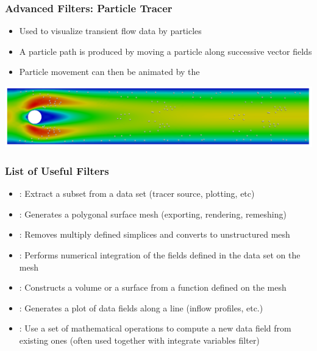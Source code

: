\begin{frame}

  \frametitle{Advanced Filters: Particle Tracer}

    \begin{itemize}
      \item Used to visualize transient flow data by particles 
      \item A particle path is produced by moving a particle along successive vector fields 
      \item Particle movement can then be animated by the  
    \end{itemize}
    \includegraphics[width=\textwidth]{screenshots/particle-tracer.png}

\end{frame}

\begin{frame}

  \frametitle{List of Useful Filters}

    \begin{itemize}
      \item {}: Extract a subset from a data set (tracer source, plotting, etc)
      \item {}: Generates a polygonal surface mesh (exporting, rendering, remeshing) 
      \item {}: Removes multiply defined simplices and converts to unstructured mesh
      \item {}: Performs numerical integration of the fields defined in the data set on the mesh 
      \item {}: Constructs a volume or a surface from a function defined on the mesh 
      \item {}: Generates a plot of data fields along a line (inflow profiles, etc.) 
      \item {}: Use a set of mathematical operations to compute a new data field from existing ones (often used together with integrate variables filter)
    \end{itemize}

\end{frame}

